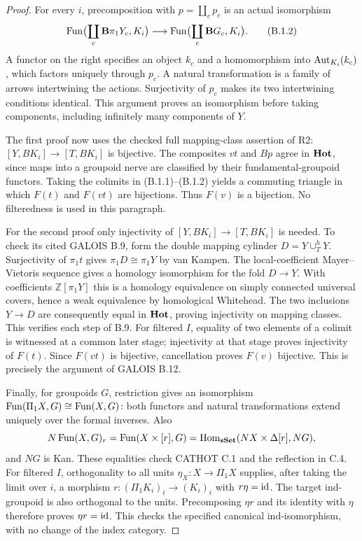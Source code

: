 \begin{proof}
For every $i$, precomposition with $p=\coprod_cp_c$ is an actual isomorphism
\[
 \operatorname{Fun}\bigl(\coprod_c\mathbf B\pi_1Y_c,K_i\bigr)
 \longrightarrow
 \operatorname{Fun}\bigl(\coprod_c\mathbf BG_c,K_i\bigr). \tag{B.1.2}
\]
A functor on the right specifies an object $k_c$ and a homomorphism into $\operatorname{Aut}_{K_i}(k_c)$, which factors uniquely through $p_c$. A natural transformation is a family of arrows intertwining the actions. Surjectivity of $p_c$ makes its two intertwining conditions identical. This argument proves an isomorphism before taking components, including infinitely many components of $Y$.

The first proof now uses the checked full mapping-class assertion of R2: $[Y,BK_i]\to[T,BK_i]$ is bijective. The composites $vt$ and $Bp$ agree in $\mathbf{Hot}$, since maps into a groupoid nerve are classified by their fundamental-groupoid functors. Taking the colimits in (B.1.1)--(B.1.2) yields a commuting triangle in which $F(t)$ and $F(vt)$ are bijections. Thus $F(v)$ is a bijection. No filteredness is used in this paragraph.

For the second proof only injectivity of $[Y,BK_i]\to[T,BK_i]$ is needed. To check its cited GALOIS B.9, form the double mapping cylinder $D=Y\cup_T^hY$. Surjectivity of $\pi_1t$ gives $\pi_1D\cong\pi_1Y$ by van Kampen. The local-coefficient Mayer--Vietoris sequence gives a homology isomorphism for the fold $D\to Y$. With coefficients $\mathbb Z[\pi_1Y]$ this is a homology equivalence on simply connected universal covers, hence a weak equivalence by homological Whitehead. The two inclusions $Y\to D$ are consequently equal in $\mathbf{Hot}$, proving injectivity on mapping classes. This verifies each step of B.9. For filtered $I$, equality of two elements of a colimit is witnessed at a common later stage; injectivity at that stage proves injectivity of $F(t)$. Since $F(vt)$ is bijective, cancellation proves $F(v)$ bijective. This is precisely the argument of GALOIS B.12.

Finally, for groupoids $G$, restriction gives an isomorphism $\operatorname{Fun}(\Pi_1X,G)\cong\operatorname{Fun}(X,G)$: both functors and natural transformations extend uniquely over the formal inverses. Also
\[
 N\operatorname{Fun}(X,G)_r=\operatorname{Fun}(X\times[r],G)
 =\operatorname{Hom}_{\mathbf{sSet}}(NX\times\Delta[r],NG),
\]
and $NG$ is Kan. These equalities check CATHOT C.1 and the reflection in C.4. For filtered $I$, orthogonality to all units $\eta_X:X\to\Pi_1X$ supplies, after taking the limit over $i$, a morphism $r:(\Pi_1K_i)_i\to(K_i)_i$ with $r\eta=\mathrm{id}$. The target ind-groupoid is also orthogonal to the units. Precomposing $\eta r$ and its identity with $\eta$ therefore proves $\eta r=\mathrm{id}$. This checks the specified canonical ind-isomorphism, with no change of the index category.
\end{proof}


